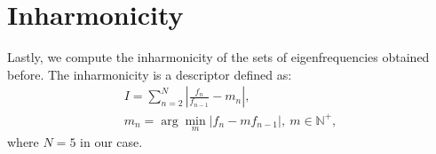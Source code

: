 \documentclass[a4paper]{article}
\begin{document}
\section{Inharmonicity}

Lastly, we compute the inharmonicity of the sets of eigenfrequencies obtained before. The inharmonicity is a descriptor defined as:
\begin{gather*}
	I = \sum_{n=2}^{N} \left| \frac{f_n}{f_{n-1}} - m_n \right|, \\
	m_n = \arg \underset{m}{\min} \left| f_n - m f_{n-1} \right|,~ m \in \mathbb{N}^+,
\end{gather*}
where $N=5$ in our case.
\end{document}
